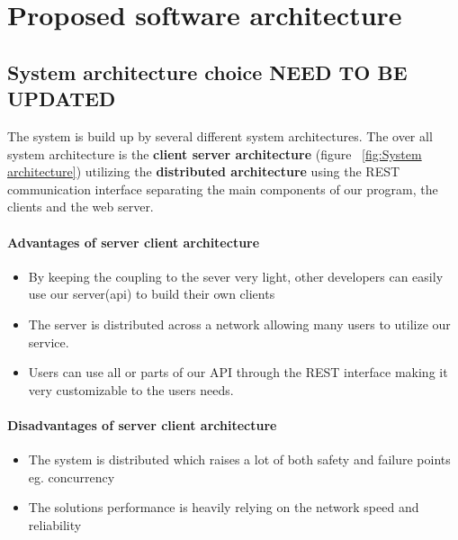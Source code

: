 \section{Proposed software architecture}
\label{sec:Proposed software architecture}






\subsection{System architecture choice NEED TO BE UPDATED}
The system is build up by several different system architectures.
The over all system architecture is the \textbf{client server architecture} (figure ~\ref{fig:System architecture}) utilizing the \textbf{distributed architecture} using the REST communication interface separating  the main components of our program, the clients and the web server.

\paragraph{Advantages of server client architecture}
\begin{itemize}
	\item By keeping the coupling to the sever very light, other developers can easily use our server(api) to build their own clients \\
	\item The server is distributed across a network allowing many users to utilize our service.
	\item Users can use all or parts of our API through the REST interface making it very customizable to the users needs.
\end{itemize}
\paragraph{Disadvantages of server client architecture}
\begin{itemize}
	\item The system is distributed which raises a lot of both safety and failure points eg. concurrency  \\
	\item The solutions performance is heavily relying on the network speed and reliability  
\end{itemize}

